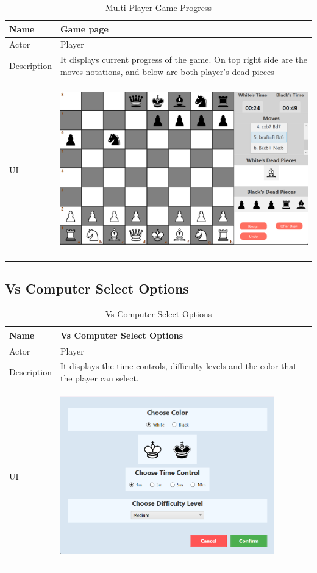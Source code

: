 \documentclass[a4paper,12pt]{article}
\begin{document}
\begin{longtable}{|m{}|m{}|}
    \caption{Multi-Player Game Progress} \\
    \hline
    Name & Game page \\
    \hline
    Actor & Player \\
    \hline
    Description & It displays current progress of the game. On top right side are the moves notations, and below are both player's dead pieces\\ 
    \hline
    \centering UI & 
    \begin{center}
        \includegraphics[height=2.7in]{Images/Use Cases/multiplayerProgress.png}
    \end{center} \\ 
    \hline
\end{longtable}

\subsection{Vs Computer Select Options}

\begin{longtable}{|m{}|m{}|}
    \caption{Vs Computer Select Options} \\
    \hline
    Name & Vs Computer Select Options \\
    \hline
    Actor & Player \\
    \hline
    Description & It displays the time controls, difficulty levels and the color that the player can select.  \\ 
    \hline
    \centering UI & 
    \begin{center}
        \includegraphics[height=2.7in]{Images/Use Cases/vsComputerSelectOptions.png}
    \end{center} \\ 
    \hline
\end{longtable}
\end{document}
